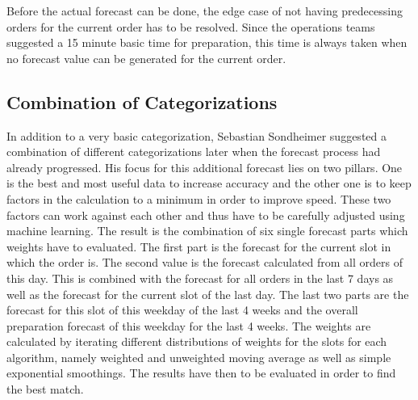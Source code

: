 Before the actual forecast can be done, the edge case of not having predecessing orders for the current order has to be resolved. Since the operations teams suggested a 15 minute basic time for preparation, this time is always taken when no forecast value can be generated for the current order.
\subsection{Combination of Categorizations}\label{subsection:Categorizing by Order}
In addition to a very basic categorization, Sebastian Sondheimer suggested a combination of different categorizations later when the forecast process had already progressed. His focus for this additional forecast lies on two pillars. One is the best and most useful data to increase accuracy and the other one is to keep factors in the calculation to a minimum in order to improve speed. These two factors can work against each other and thus have to be carefully adjusted using machine learning. The result is the combination of six single forecast parts which weights have to evaluated. The first part is the forecast for the current slot in which the order is. The second value is the forecast calculated from all orders of this day. This is combined with the forecast for all orders in the last 7 days as well as the forecast for the current slot of the last day. The last two parts are the forecast for this slot of this weekday of the last 4 weeks and the overall preparation forecast of this weekday for the last 4 weeks. The weights are calculated by iterating different distributions of weights for the slots for each algorithm, namely weighted and unweighted moving average as well as simple exponential smoothings. The results have then to be evaluated in order to find the best match.
